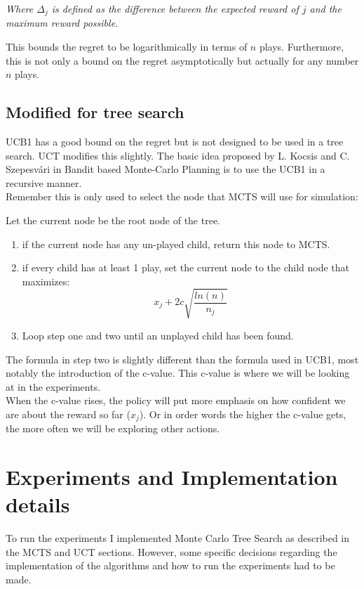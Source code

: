 \documentclass[11pt,a4paper]{article}
\begin{document}
\textit{Where $\Delta_j$ is defined as the difference between the expected reward of $j$ and the maximum reward possible.\\}

This bounds the regret to be logarithmically in terms of $n$ plays. Furthermore, this is not only a bound on the regret asymptotically but actually for any number $n$ plays.\\

\subsection{Modified for tree search}
UCB1 has a good bound on the regret but is not designed to be used in a tree search. UCT modifies this slightly. The basic idea proposed by L. Kocsis and C. Szepesv{\'a}ri in Bandit based Monte-Carlo Planning\cite{Kocsis:2006} is to use the UCB1 in a recursive manner.\\

Remember this is only used to select the node that MCTS will use for simulation:

Let the current node be the root node of the tree.
\begin{enumerate}
	\item if the current node has any un-played child, return this node to MCTS.
	\item if every child has at least 1 play, set the current node to the child node that maximizes:
	\[
	x_j + 2c\sqrt{\dfrac{ln(n)}{n_j}}
	\]
	\item Loop step one and two until an unplayed child has been found.
\end{enumerate}


The formula in step two is slightly different than the formula used in UCB1, most notably the introduction of the c-value. This c-value is where we will be looking at in the experiments.\\

When the c-value rises, the policy will put more emphasis on how confident we are about the reward so far ($x_j$). Or in order words the higher the c-value gets, the more often we will be exploring other actions.

\section{Experiments and Implementation details}
To run the experiments I implemented Monte Carlo Tree Search as described in the MCTS and UCT sections. However, some specific decisions regarding the implementation of the algorithms and how to run the experiments had to be made.
\end{document}
